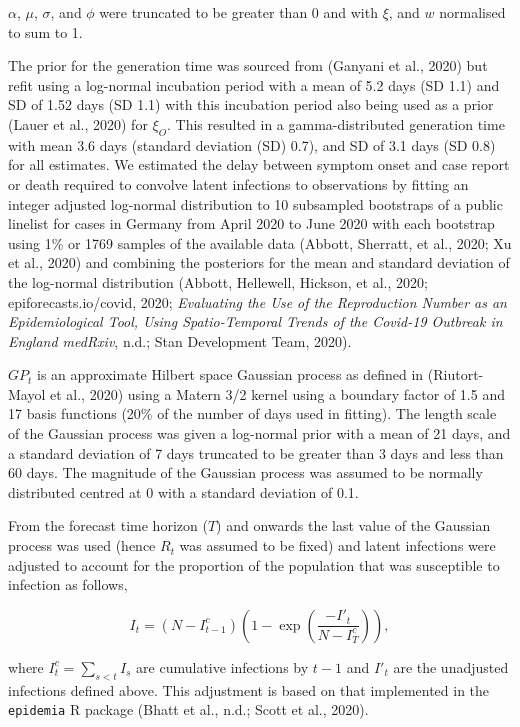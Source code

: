 \documentclass[
]{article}
\begin{document}
\(\alpha\), \(\mu\), \(\sigma\), and \(\phi\) were truncated to be greater than 0 and with \(\xi\), and \(w\) normalised to sum to 1.

The prior for the generation time was sourced from (Ganyani et al., 2020) but refit using a log-normal incubation period with a mean of 5.2 days (SD 1.1) and SD of 1.52 days (SD 1.1) with this incubation period also being used as a prior (Lauer et al., 2020) for \(\xi_{O}\). This resulted in a gamma-distributed generation time with mean 3.6 days (standard deviation (SD) 0.7), and SD of 3.1 days (SD 0.8) for all estimates. We estimated the delay between symptom onset and case report or death required to convolve latent infections to observations by fitting an integer adjusted log-normal distribution to 10 subsampled bootstraps of a public linelist for cases in Germany from April 2020 to June 2020 with each bootstrap using 1\% or 1769 samples of the available data (Abbott, Sherratt, et al., 2020; Xu et al., 2020) and combining the posteriors for the mean and standard deviation of the log-normal distribution (Abbott, Hellewell, Hickson, et al., 2020; epiforecasts.io/covid, 2020; \emph{Evaluating the Use of the Reproduction Number as an Epidemiological Tool, Using Spatio-Temporal Trends of the {Covid}-19 Outbreak in {England} \textbar{} {medRxiv}}, n.d.; Stan Development Team, 2020).

\(GP_t\) is an approximate Hilbert space Gaussian process as defined in (Riutort-Mayol et al., 2020) using a Matern 3/2 kernel using a boundary factor of 1.5 and 17 basis functions (20\% of the number of days used in fitting). The length scale of the Gaussian process was given a log-normal prior with a mean of 21 days, and a standard deviation of 7 days truncated to be greater than 3 days and less than 60 days. The magnitude of the Gaussian process was assumed to be normally distributed centred at 0 with a standard deviation of 0.1.

From the forecast time horizon (\(T\)) and onwards the last value of the Gaussian process was used (hence \(R_t\) was assumed to be fixed) and latent infections were adjusted to account for the proportion of the population that was susceptible to infection as follows,

\begin{equation}
    I_t = (N - I^c_{t-1}) \left(1 - \exp \left(\frac{-I'_t}{N - I^c_{T}}\right)\right),
\end{equation}

where \(I^c_t = \sum_{s< t} I_s\) are cumulative infections by \(t-1\) and \(I'_t\) are the unadjusted infections defined above. This adjustment is based on that implemented in the \texttt{epidemia} R package (Bhatt et al., n.d.; Scott et al., 2020).
\end{document}
